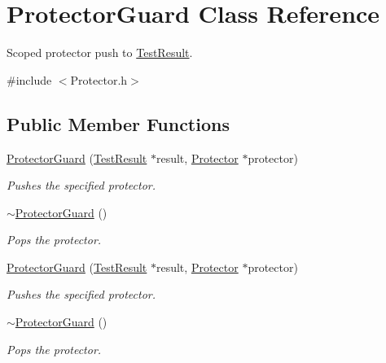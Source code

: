 \hypertarget{class_protector_guard}{\section{Protector\+Guard Class Reference}
\label{class_protector_guard}
}


Scoped protector push to \hyperlink{class_test_result}{Test\+Result}.  




{\ttfamily \#include $<$Protector.\+h$>$}

\subsection*{Public Member Functions}
\begin{DoxyCompactItemize}
\item 
\hypertarget{class_protector_guard_abc4a3b2b51b6d93fb3dd9fed1bbc85db}{\hyperlink{class_protector_guard_abc4a3b2b51b6d93fb3dd9fed1bbc85db}{Protector\+Guard} (\hyperlink{class_test_result}{Test\+Result} $\ast$result, \hyperlink{class_protector}{Protector} $\ast$protector)}\label{class_protector_guard_abc4a3b2b51b6d93fb3dd9fed1bbc85db}

\begin{DoxyCompactList}\small\item\em Pushes the specified protector. \end{DoxyCompactList}\item 
\hypertarget{class_protector_guard_af80b574cc5999746e77ec13d2d0093f5}{\hyperlink{class_protector_guard_af80b574cc5999746e77ec13d2d0093f5}{$\sim$\+Protector\+Guard} ()}\label{class_protector_guard_af80b574cc5999746e77ec13d2d0093f5}

\begin{DoxyCompactList}\small\item\em Pops the protector. \end{DoxyCompactList}\item 
\hypertarget{class_protector_guard_abc4a3b2b51b6d93fb3dd9fed1bbc85db}{\hyperlink{class_protector_guard_abc4a3b2b51b6d93fb3dd9fed1bbc85db}{Protector\+Guard} (\hyperlink{class_test_result}{Test\+Result} $\ast$result, \hyperlink{class_protector}{Protector} $\ast$protector)}\label{class_protector_guard_abc4a3b2b51b6d93fb3dd9fed1bbc85db}

\begin{DoxyCompactList}\small\item\em Pushes the specified protector. \end{DoxyCompactList}\item 
\hypertarget{class_protector_guard_af80b574cc5999746e77ec13d2d0093f5}{\hyperlink{class_protector_guard_af80b574cc5999746e77ec13d2d0093f5}{$\sim$\+Protector\+Guard} ()}\label{class_protector_guard_af80b574cc5999746e77ec13d2d0093f5}

\begin{DoxyCompactList}\small\item\em Pops the protector. \end{DoxyCompactList}\end{DoxyCompactItemize}


